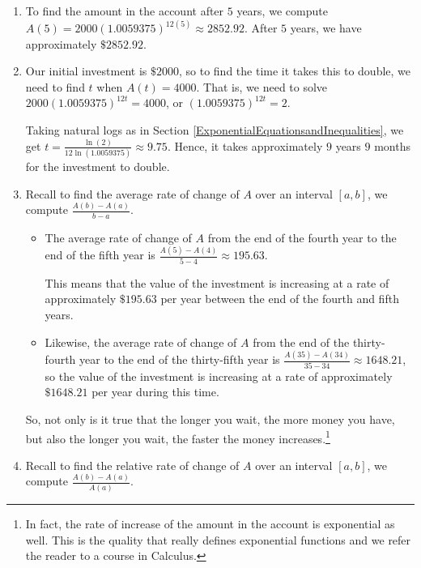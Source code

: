 \documentclass{ximera}
\begin{document}
\begin{example}
\begin{explanation}
\begin{enumerate}
\item  To find the amount in the account after $5$ years, we compute $A(5) = 2000 (1.0059375)^{12(5)} \approx 2852.92$.  After $5$ years, we have approximately $\$2852.92$.

\item  Our initial investment is $\$2000$, so to find the time it takes this to double, we need to find $t$ when $A(t) = 4000$.  That is, we need to solve $2000 (1.0059375)^{12t}=4000$, or $(1.0059375)^{12t}=2$.  

Taking natural logs as in Section \ref{ExponentialEquationsandInequalities}, we get $t = \frac{\ln(2)}{12 \ln(1.0059375)} \approx 9.75$.  Hence, it takes approximately $9$ years $9$ months for the investment to double.

\item  Recall to find the average rate of change of $A$ over an interval $[a,b]$, we compute $\frac{A(b)-A(a)}{b-a}$.

\begin{itemize}

\item  The average rate of change of $A$  from the end of the fourth year to the end of the fifth year is $\frac{A(5)-A(4)}{5-4} \approx 195.63$.  

 

This means that the value of the investment is increasing at a rate of approximately $\$195.63$ per year between the end of the fourth and fifth years.

\item  Likewise, the average rate of change of $A$  from the end of the thirty-fourth year to the end of the thirty-fifth year is $\frac{A(35)-A(34)}{35-34} \approx 1648.21$, so the value of the investment is increasing at a rate of approximately $\$1648.21$ per year during this time.

\end{itemize}

So, not only is it true that the longer you wait, the more money you have, but also the longer you wait, the faster the money increases.\footnote{In fact, the rate of increase of the amount in the account is exponential as well.  This is the quality that really defines exponential functions and we refer the reader to a course in Calculus.} 

\item    Recall to find the relative rate of change of $A$ over an interval $[a,b]$, we compute $\frac{A(b)-A(a)}{A(a)}$.


\end{enumerate}
\end{explanation}
\end{example}
\end{document}
